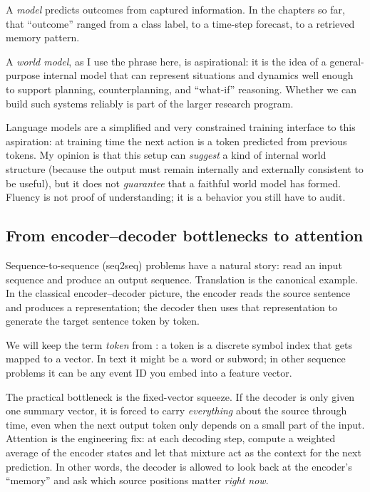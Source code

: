 \begin{tcolorbox}[perspectivebox, title={Author's note: models, world models, and language models (an opinionated lens)}]
A \emph{model} predicts outcomes from captured information. In the chapters so far, that ``outcome'' ranged
from a class label, to a time-step forecast, to a retrieved memory pattern.

A \emph{world model}, as I use the phrase here, is aspirational: it is the idea of a general-purpose internal
model that can represent situations and dynamics well enough to support planning, counterplanning, and
``what-if'' reasoning. Whether we can build such systems reliably is part of the larger research program.

Language models are a simplified and very constrained training interface to this aspiration: at training time
the next action is a token predicted from previous tokens. My opinion is that this setup can \emph{suggest}
a kind of internal world structure (because the output must remain internally and externally consistent to be
useful), but it does not \emph{guarantee} that a faithful world model has formed. Fluency is not proof of
understanding; it is a behavior you still have to audit.
\end{tcolorbox}

\subsection{From encoder--decoder bottlenecks to attention}
\label{sec:transformers_why_transformers_after_rnns}
Sequence-to-sequence (seq2seq) problems have a natural story: read an input sequence and produce an output sequence. Translation is the canonical example. In the classical encoder--decoder picture, the encoder reads the source sentence and produces a representation; the decoder then uses that representation to generate the target sentence token by token.

We will keep the term \emph{token} from : a token is a discrete symbol index that gets mapped to a vector. In text it might be a word or subword; in other sequence problems it can be any event ID you embed into a feature vector.

The practical bottleneck is the fixed-vector squeeze. If the decoder is only given one summary vector, it is forced to carry \emph{everything} about the source through time, even when the next output token only depends on a small part of the input. Attention is the engineering fix: at each decoding step, compute a weighted average of the encoder states and let that mixture act as the context for the next prediction. In other words, the decoder is allowed to look back at the encoder's ``memory'' and ask which source positions matter \emph{right now}.

